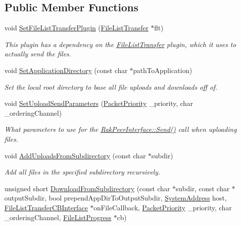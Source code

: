 \subsection*{Public Member Functions}
\begin{DoxyCompactItemize}
\item 
void \hyperlink{class_rak_net_1_1_directory_delta_transfer_add2a7f2989b6cab0d33c954f9264147a}{Set\-File\-List\-Transfer\-Plugin} (\hyperlink{class_rak_net_1_1_file_list_transfer}{File\-List\-Transfer} $\ast$flt)
\begin{DoxyCompactList}\small\item\em This plugin has a dependency on the \hyperlink{class_rak_net_1_1_file_list_transfer}{File\-List\-Transfer} plugin, which it uses to actually send the files. \end{DoxyCompactList}\item 
void \hyperlink{class_rak_net_1_1_directory_delta_transfer_ab728286a8ecad1787e6d6f0e04c8711d}{Set\-Application\-Directory} (const char $\ast$path\-To\-Application)
\begin{DoxyCompactList}\small\item\em Set the local root directory to base all file uploads and downloads off of. \end{DoxyCompactList}\item 
void \hyperlink{class_rak_net_1_1_directory_delta_transfer_aa614f6ac15e8a6342fd22bbb47e8790d}{Set\-Upload\-Send\-Parameters} (\hyperlink{_packet_priority_8h_a659378374e516180f93640c79f59705c}{Packet\-Priority} \-\_\-priority, char \-\_\-ordering\-Channel)
\begin{DoxyCompactList}\small\item\em What parameters to use for the \hyperlink{class_rak_net_1_1_rak_peer_interface_a543ec5be9cf5f73f5c8733d1829789f9}{Rak\-Peer\-Interface\-::\-Send()} call when uploading files. \end{DoxyCompactList}\item 
void \hyperlink{class_rak_net_1_1_directory_delta_transfer_aaf3c16175f73e93a3fd42638050d431a}{Add\-Uploads\-From\-Subdirectory} (const char $\ast$subdir)
\begin{DoxyCompactList}\small\item\em Add all files in the specified subdirectory recursively. \end{DoxyCompactList}\item 
unsigned short \hyperlink{class_rak_net_1_1_directory_delta_transfer_aa120a4ea8fc63b776281ef489db5a7b6}{Download\-From\-Subdirectory} (const char $\ast$subdir, const char $\ast$output\-Subdir, bool prepend\-App\-Dir\-To\-Output\-Subdir, \hyperlink{struct_rak_net_1_1_system_address}{System\-Address} host, \hyperlink{class_rak_net_1_1_file_list_transfer_c_b_interface}{File\-List\-Transfer\-C\-B\-Interface} $\ast$on\-File\-Callback, \hyperlink{_packet_priority_8h_a659378374e516180f93640c79f59705c}{Packet\-Priority} \-\_\-priority, char \-\_\-ordering\-Channel, \hyperlink{class_rak_net_1_1_file_list_progress}{File\-List\-Progress} $\ast$cb)

\end{DoxyCompactItemize}
